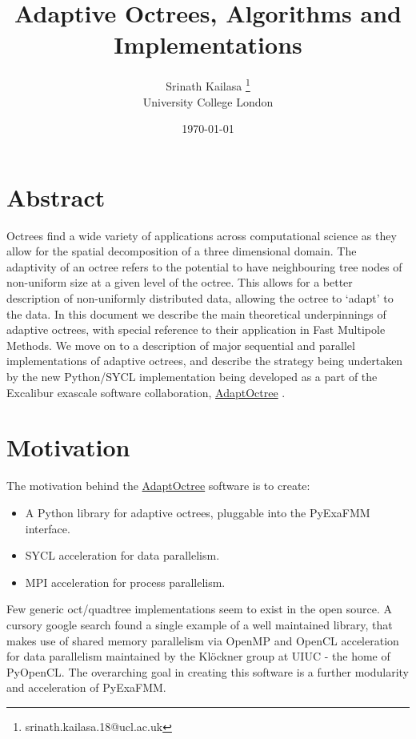 \documentclass[12pt, a4, twoside]{article}
\title{Adaptive Octrees, Algorithms and Implementations}
\author{Srinath Kailasa \thanks{srinath.kailasa.18@ucl.ac.uk} \\ \small University College London}
\date{\today}
\begin{document}
\maketitle

\section*{Abstract}

Octrees find a wide variety of applications across computational science as they allow for the spatial decomposition of a three dimensional domain. The adaptivity of an octree refers to the potential to have neighbouring tree nodes of non-uniform size at a given level of the octree. This allows for a better description of non-uniformly distributed data, allowing the octree to `adapt' to the data. In this document we describe the main theoretical underpinnings of adaptive octrees, with special reference to their application in Fast Multipole Methods. We move on to a description of major sequential and parallel implementations of adaptive octrees, and describe the strategy being undertaken by the new Python/SYCL implementation being developed as a part of the Excalibur exascale software collaboration, \href{https://github.com/Excalibur-SLE/AdaptOctree}{AdaptOctree}  \cite{excalibur}.

\section*{Motivation}

The motivation behind the \href{https://github.com/Excalibur-SLE/AdaptOctree}{AdaptOctree} software is to create:

\begin{itemize}
    \item A Python library for adaptive octrees, pluggable into the PyExaFMM interface.
    \item SYCL acceleration for data parallelism.
    \item MPI acceleration for process parallelism.
\end{itemize}

Few generic oct/quadtree implementations seem to exist in the open source. A cursory google search found a single example of a well maintained library, that makes use of shared memory parallelism via OpenMP and OpenCL acceleration for data parallelism maintained by the Klöckner group at UIUC \cite{boxtree} - the home of PyOpenCL. The overarching goal in creating this software is a further modularity and acceleration of PyExaFMM.
\end{document}
